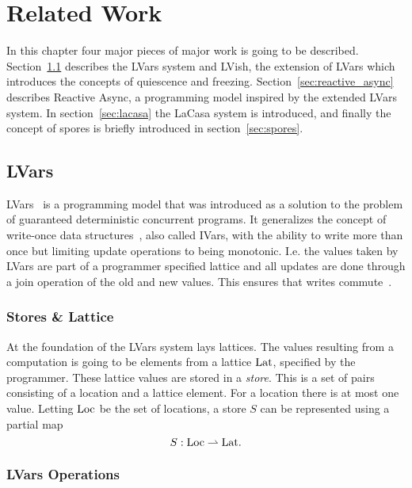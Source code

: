 \chapter{Related Work}\label{cha:related_work}

In this chapter four major pieces of major work is going to be described.
Section~\ref{sec:lvars} describes the LVars system and LVish, the extension
of LVars which introduces the concepts of quiescence and freezing. 
Section~\ref{sec:reactive_async} describes Reactive Async, a programming model
inspired by the extended LVars system. In section~\ref{sec:lacasa} the LaCasa
system is introduced, and finally the concept of spores is briefly introduced in
section~\ref{sec:spores}.

\section{LVars}\label{sec:lvars}

LVars~\parencite{kuper2013lvars} is a programming model that was introduced as a
solution to the problem of guaranteed deterministic concurrent programs. It
generalizes the concept of write-once data
structures~\parencite{nikhil1989structures}, also called IVars, with the ability
to write more than once but limiting update operations to being monotonic. I.e.
the values taken by LVars are part of a programmer specified lattice and all
updates are done through a join operation of the old and new values. This
ensures that writes commute~\parencite{kuper2013lvars}.

\subsection{Stores \& Lattice}%
\label{sub:stores_and_lattice}

At the foundation of the LVars system lays lattices. The values resulting from a
computation is going to be elements from a lattice $\mathrm{Lat}$, specified by the
programmer. These lattice values are stored in a \emph{store}.  This is a set of
pairs consisting of a location and a lattice element. For a location there is
at most one value. Letting $\mathrm{Loc}$ be the set of locations, a store $S$ can
be represented using a partial map
\begin{equation*}
  S: \mathrm{Loc} \rightharpoonup \mathrm{Lat}.
\end{equation*}

\subsection{LVars Operations}%
\label{sub:lvars_operations}

